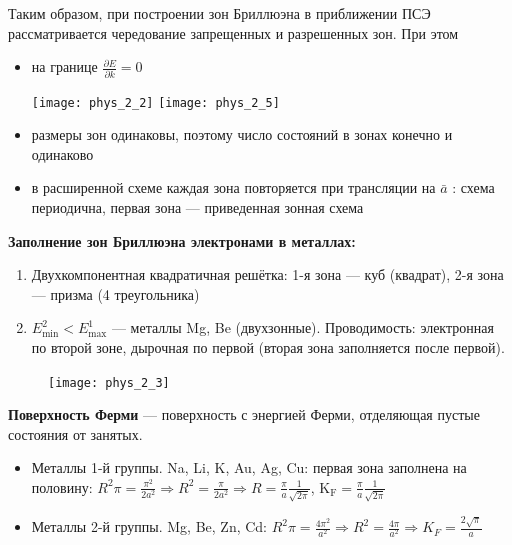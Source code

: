 Таким образом, при построении зон Бриллюэна в приближении ПСЭ рассматривается чередование запрещенных и разрешенных зон. При этом

\begin{itemize}
    \item на границе $\displaystyle \frac{\partial E}{\partial k} =0$
    
    \texttt{[image: phys\_2\_2]} \texttt{[image: phys\_2\_5]}
    
    \item размеры зон одинаковы, поэтому число состояний в зонах конечно и одинаково
    \item в расширенной схеме каждая зона повторяется при трансляции на $\bar{a}$ : схема периодична, первая зона --- приведенная зонная схема 
\end{itemize}

\textbf{Заполнение зон Бриллюэна электронами в металлах:}

\begin{enumerate}
    \item Двухкомпонентная квадратичная решётка: 1-я зона --- куб (квадрат), 2-я зона --- призма (4 треугольника)
    \item $E_{\min} ^2 < E_{\max} ^1$ --- металлы Mg, Be (двухзонные). Проводимость: электронная по второй зоне, дырочная по первой (вторая зона заполняется после первой).
\end{enumerate}

\begin{figure}[h!]
    \centering
    \texttt{[image: phys\_2\_3]}
\end{figure}



\textbf{Поверхность Ферми} --- поверхность с энергией Ферми, отделяющая пустые состояния от занятых.

\begin{itemize}
    \item Металлы 1-й группы. Na, Li, K, Au, Ag, Cu: первая зона заполнена на половину: $\displaystyle R^2 \pi=\frac{\pi^2}{2 a^2} \Rightarrow R^2=\frac{\pi}{2 a^2} \Rightarrow R=\frac{\pi}{a} \frac{1}{\sqrt{2 \pi}}$, $\displaystyle \mathrm{K}_{\mathrm{F}}=\frac{\pi}{a} \frac{1}{\sqrt{2 \pi}}$
    \item Металлы 2-й группы. Mg, Be, Zn, Cd: $R^2 \pi= \frac{4\pi^2}{a^2} \Rightarrow R^2=\frac{4 \pi}{a^2} \Rightarrow K_F=\frac{2 \sqrt{\pi}}{a}$

\end{itemize}

